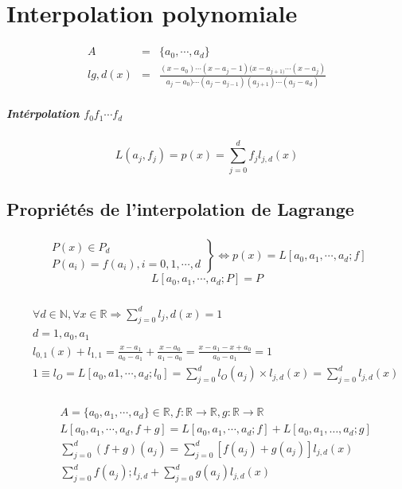\documentclass[12pt,a4paper,openany]{book}
\newcommand{\N}{\mathbb{N}}
\newcommand{\R}{\mathbb{R}}
\begin{document}
	\setcounter{tocdepth}{1}
	\setcounter{secnumdepth}{3}
	\maketitle
	\tableofcontents
	\chapter{Interpolation polynomiale}
		\begin{eqnarray*}
			A&=&\{a_0,\cdots,a_d\}\\
			lg,d(x)&=&\frac{(x-a_0) \cdots
			(x-a_j-1)(x-a_{j+1)}\cdots
			(x-a_j)}{a_j-a_0)\cdots(a_j-a_{j-1})(a_{j+1})\cdots(a_j-a_d)}
		\end{eqnarray*}
		\paragraph{Intérpolation $f_0 f_1 \cdots f_d$}
			$$	L(a_j,f_j) = p(x) =
			\sum^d_{j=0}f_jl_{j,d}(x)$$
			\section{Propriétés de l'interpolation de
			Lagrange}
			\subsection{}
			\begin{displaymath}
				\left. \begin{array}{cc}
				P(x) \in P_d\\
				P(a_i) = f(a_i), i = 0,1,\cdots,d
			\end{array}\right\}
			\Leftrightarrow p(x) = L[a_0,a_1,\cdots,a_d;f]
			\end{displaymath}
			$$ L[a_0, a_1, \cdots, a_d;P]= P$$
			\subsection{}
			\begin{eqnarray*}
&&				\forall d \in \N, \forall x \in \R \Rightarrow \sum^d_{j=0}l_j,d(x) = 1\\
&&				d=1, a_0,a_1\\
&&				l_{0,1}(x) + l_{1,1} = \frac{x-a_1}{a_0-a_1} + \frac{x-a_0}{a_1-a_0} = \frac{x-a_1-x+a_0}{a_0-a_1} = 1\\
&&			1 \equiv l_O = L[a_0, a1, \cdots, a_d ; l_0] = \sum^d_{j=0}l_O(a_j)\times l_{j,d}(x) = \sum^{d}_{j=0}l_{j,d}(x)
			\end{eqnarray*}
			\subsection{}
			\begin{eqnarray*}
				&&A=\{a_0,a_1,\cdots,a_d\}\in \R , f:\R \rightarrow \R, g:\R \rightarrow \R\\
				&&L[a_0,a_1,\cdots,a_d,f+g] = L[a_0,a_1,\cdots,a_d;f] + L[a_0,a_1,\ldots,a_d;g]\\
				&& \sum^d_{j=0}(f+g)(a_j) = \sum^d_{j=0}[f(a_j)+g(a_j)]l_{j,d}(x)\\
				&& \sum^d_{j=0}f(a_j) ; l_{j,d} + \sum^d_{j=0}g(a_j)l_{j,d}(x)
			\end{eqnarray*}
	\appendix
	\lstlistoflistings
	\listoffigures
\end{document}
